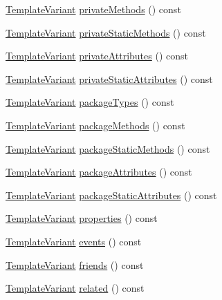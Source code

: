 \begin{DoxyCompactItemize}
\item 
\hyperlink{class_template_variant}{Template\+Variant} \hyperlink{class_class_context_1_1_private_a5099542b79384ffc98dfcff2af298039}{private\+Methods} () const 
\item 
\hyperlink{class_template_variant}{Template\+Variant} \hyperlink{class_class_context_1_1_private_ac5260d2c037fa2921278fee35c2c37a4}{private\+Static\+Methods} () const 
\item 
\hyperlink{class_template_variant}{Template\+Variant} \hyperlink{class_class_context_1_1_private_a3c58c4ff2163178957eaed7d075c1957}{private\+Attributes} () const 
\item 
\hyperlink{class_template_variant}{Template\+Variant} \hyperlink{class_class_context_1_1_private_abc811bd342b085f893b1dd061fbc7eb1}{private\+Static\+Attributes} () const 
\item 
\hyperlink{class_template_variant}{Template\+Variant} \hyperlink{class_class_context_1_1_private_a472d269cbea7bcecf978b6f15bf0a649}{package\+Types} () const 
\item 
\hyperlink{class_template_variant}{Template\+Variant} \hyperlink{class_class_context_1_1_private_aee309e0a1728e439905cfac57c9e8c31}{package\+Methods} () const 
\item 
\hyperlink{class_template_variant}{Template\+Variant} \hyperlink{class_class_context_1_1_private_ae45d9e274d09f395d078b6595abdfb8f}{package\+Static\+Methods} () const 
\item 
\hyperlink{class_template_variant}{Template\+Variant} \hyperlink{class_class_context_1_1_private_a633a669f8212f316f37feaa9bd435cc0}{package\+Attributes} () const 
\item 
\hyperlink{class_template_variant}{Template\+Variant} \hyperlink{class_class_context_1_1_private_abe8ad7e71d27af35549c0acc459497c3}{package\+Static\+Attributes} () const 
\item 
\hyperlink{class_template_variant}{Template\+Variant} \hyperlink{class_class_context_1_1_private_ac9794c7133b536e6cbd7b7247e285fda}{properties} () const 
\item 
\hyperlink{class_template_variant}{Template\+Variant} \hyperlink{class_class_context_1_1_private_ae27f913d041c545165e0ec62d61bc0f1}{events} () const 
\item 
\hyperlink{class_template_variant}{Template\+Variant} \hyperlink{class_class_context_1_1_private_a398d08bda527aaf73ed7fdccf1a8b3f3}{friends} () const 
\item 
\hyperlink{class_template_variant}{Template\+Variant} \hyperlink{class_class_context_1_1_private_a3b88b01f372a4259c59245e03fb18d82}{related} () const 

\end{DoxyCompactItemize}
